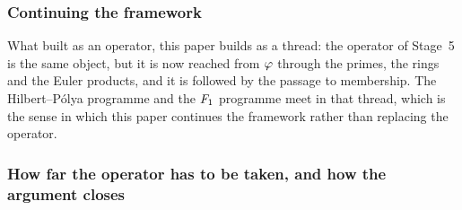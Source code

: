 \subsubsection{Continuing the framework}\label{ssec:disc-hp-framework}

What \cite{gonzalez25hp} built as an operator, this paper builds as a thread: the
operator of Stage~5 is the same object, but it is now reached from $\varphi$ through
the primes, the rings and the Euler products, and it is followed by the passage to
membership.  The Hilbert--P\'olya programme and the $F_1$ programme meet in that
thread, which is the sense in which this paper continues the framework rather than
replacing the operator.

\subsubsection{How far the operator has to be taken, and how the argument closes}\label{ssec:disc-hp-closure}

